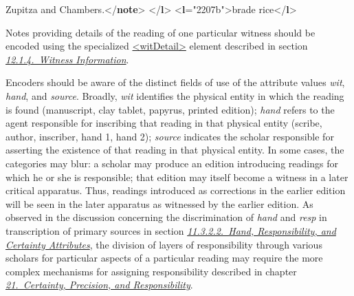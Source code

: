 \begin{shaded}
\hspace*{1em}\hspace*{1em}\hspace*{1em}\hspace*{1em} Zupitza and Chambers.{</\textbf{note}>}\mbox{}\newline 
{}\mbox{}\newline 
{</\textbf{l}>}\mbox{}\newline 
{<\textbf{l}\hspace*{1em}{n}="{2207b}">}brade rice{</\textbf{l}>}\end{shaded}\egroup\par \noindent   Notes providing details of the reading of one particular witness should be encoded using the specialized \hyperref[TEI.witDetail]{<witDetail>} element described in section \textit{\hyperref[TCAPLW]{12.1.4.\ Witness Information}}.\par
Encoders should be aware of the distinct fields of use of the attribute values {\itshape wit}, {\itshape hand}, and {\itshape source}. Broadly, {\itshape wit} identifies the physical entity in which the reading is found (manuscript, clay tablet, papyrus, printed edition); {\itshape hand} refers to the agent responsible for inscribing that reading in that physical entity (scribe, author, inscriber, hand 1, hand 2); {\itshape source} indicates the scholar responsible for asserting the existence of that reading in that physical entity. In some cases, the categories may blur: a scholar may produce an edition introducing readings for which he or she is responsible; that edition may itself become a witness in a later critical apparatus. Thus, readings introduced as corrections in the earlier edition will be seen in the later apparatus as witnessed by the earlier edition. As observed in the discussion concerning the discrimination of {\itshape hand} and {\itshape resp} in transcription of primary sources in section \textit{\hyperref[PHHR]{11.3.2.2.\ Hand, Responsibility, and Certainty Attributes}}, the division of layers of responsibility through various scholars for particular aspects of a particular reading may require the more complex mechanisms for assigning responsibility described in chapter \textit{\hyperref[CE]{21.\ Certainty, Precision, and Responsibility}}.
